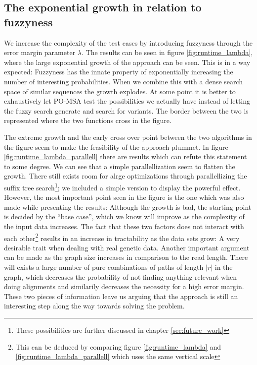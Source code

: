 \documentclass[thesis.tex]{subfiles}
\begin{document}
\subsection*{The exponential growth in relation to fuzzyness}
We increase the complexity of the test cases by introducing fuzzyness through the error margin parameter $\lambda$. The results can be seen in figure \ref{fig:runtime_lambda}, where the large exponential growth of the approach can be seen. This is in a way expected: Fuzzyness has the innate property of exponentially increasing the number of interesting probabilities. When we combine this with a dense search space of similar sequences the growth explodes. At some point it is better to exhaustively let PO-MSA test the possibilities we actually have instead of letting the fuzzy search generate and search for variants. The border between the two is represented where the two functions cross in the figure.\\
\par\noindent
The extreme growth and the early cross over point between the two algorithms in the figure seem to make the feasibility of the approach plummet. In figure \ref{fig:runtime_lambda_parallell} there are results which can refute this statement to some degree. We can see that a simple parallellization seem to flatten the growth. There still exists room for alrge optimizations through parallellizing the suffix tree search\footnote{These possibilities are further discussed in chapter \ref{sec:future_work}}; we included a simple version to display the powerful effect. However, the most important point seen in the figure is the one which was also made while presenting the results: Although the growth is bad, the starting point is decided by the ``base case'', which we know will improve as the complexity of the input data increases. The fact that these two factors does not interact with each other\footnote{This can be deduced by comparing figure \ref{fig:runtime_lambda} and \ref{fig:runtime_lambda_parallell} which uses the same vertical scale} results in an increase in tractability as the data sets grow: A very desirable trait when dealing with real genetic data. Another important argument can be made as the graph size increases in comparison to the read length. There will exists a large number of pure combinations of paths of length $|r|$ in the graph, which decreases the probability of not finding anything relevant when doing alignments and similarily decreases the necessity for a high error margin. These two pieces of information leave us arguing that the approach is still an interesting step along the way towards solving the problem.
\end{document}
